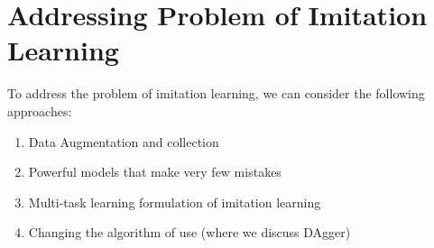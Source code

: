 \section{Addressing Problem of Imitation Learning}
To address the problem of imitation learning, we can consider the following approaches:
\begin{enumerate}
    \item Data Augmentation and collection
    \item Powerful models that make very few mistakes
    \item Multi-task learning formulation of imitation learning
    \item Changing the algorithm of use (where we discuss DAgger)
\end{enumerate}

